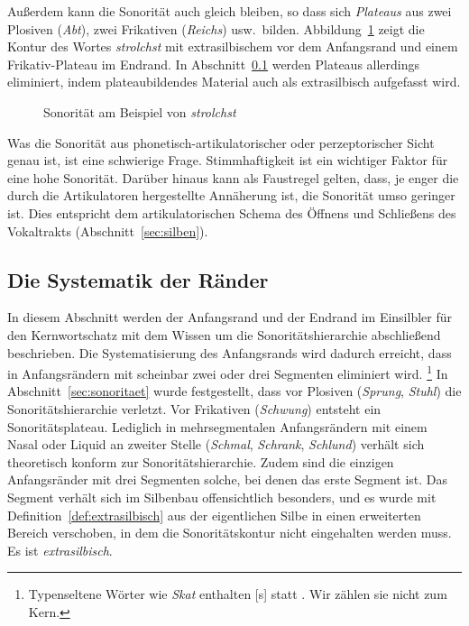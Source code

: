 Außerdem kann die Sonorität auch gleich bleiben, so dass sich \textit{Plateaus} aus zwei Plosiven (\textit{Abt}), zwei Frikativen (\textit{Reichs}) usw.\ bilden.
Abbildung~\ref{fig:sonhiersstrolchst} zeigt die Kontur des Wortes \textit{strolchst} mit extrasilbischem \textipa{[S]} vor dem Anfangsrand und einem Frikativ-Plateau im Endrand.
In Abschnitt~\ref{sec:systematikderraender} werden Plateaus allerdings eliminiert, indem plateaubildendes Material auch als extrasilbisch aufgefasst wird.

\begin{figure}[!htbp]
  \centering
  \caption{Sonorität am Beispiel von \textit{strolchst}}
  \label{fig:sonhiersstrolchst}
\end{figure}

Was die Sonorität aus phonetisch-artikulatorischer oder perzeptorischer Sicht genau ist, ist eine schwierige Frage.
Stimmhaftigkeit ist ein wichtiger Faktor für eine hohe Sonorität.
Darüber hinaus kann als Faustregel gelten, dass, je enger die durch die Artikulatoren hergestellte Annäherung ist, die Sonorität umso geringer ist.
Dies entspricht dem artikulatorischen Schema des Öffnens und Schließens des Vokaltrakts (Abschnitt~\ref{sec:silben}).

\subsection{Die Systematik der Ränder}

\label{sec:systematikderraender}

In diesem Abschnitt werden der Anfangsrand und der Endrand im Einsilbler für den Kernwortschatz mit dem Wissen um die Sonoritätshierarchie abschließend beschrieben.
Die Systematisierung des Anfangsrands wird dadurch erreicht, dass \textipa{[S]} in Anfangsrändern mit scheinbar zwei oder drei Segmenten eliminiert wird.%
\footnote{Typenseltene Wörter wie \textit{Skat} enthalten [s] statt \textipa{[S]}.
Wir zählen sie nicht zum Kern.}
In Abschnitt~\ref{sec:sonoritaet} wurde festgestellt, dass \textipa{[S]} vor Plosiven (\textit{Sprung}, \textit{Stuhl}) die Sonoritätshierarchie verletzt.
Vor Frikativen (\textit{Schwung}) entsteht ein Sonoritätsplateau.
Lediglich in mehrsegmentalen Anfangsrändern mit einem Nasal oder Liquid an zweiter Stelle (\textit{Schmal}, \textit{Schrank}, \textit{Schlund}) verhält sich \textipa{[S]} theoretisch konform zur Sonoritätshierarchie.
Zudem sind die einzigen Anfangsränder mit drei Segmenten solche, bei denen das erste Segment \textipa{[S]} ist.
Das Segment \textipa{[S]} verhält sich im Silbenbau offensichtlich besonders, und es wurde mit Definition~\ref{def:extrasilbisch} aus der eigentlichen Silbe in einen erweiterten Bereich verschoben, in dem die Sonoritätskontur nicht eingehalten werden muss.
Es ist \textit{extrasilbisch}.

